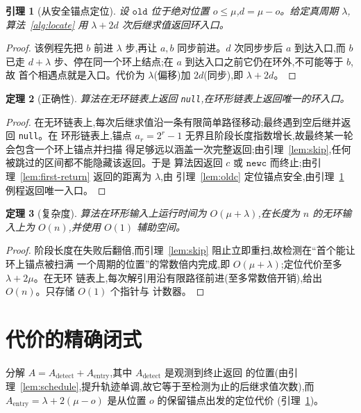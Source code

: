 \documentclass[11pt]{ctexart}
\newtheorem{theorem}{定理}[section]
\newtheorem{lemma}[theorem]{引理}
\newcommand{\nullnode}{\texttt{null}}
\newcommand{\oldc}{\texttt{old}}
\newcommand{\newc}{\texttt{newc}}
\begin{document}
\begin{lemma}[从安全锚点定位]
\label{lem:localization}
设 $\oldc$ 位于绝对位置 $o\le\mu$,$d=\mu-o$。给定真周期 $\lambda$,算法~\ref{alg:locate}
用 $\lambda+2d$ 次后继求值返回环入口。
\end{lemma}
\begin{proof}
该例程先把 $b$ 前进 $\lambda$ 步,再让 $a,b$ 同步前进。$d$ 次同步步后 $a$ 到达入口,而 $b$
已走 $d+\lambda$ 步、停在同一个环上结点;在 $a$ 到达入口之前它仍在环外,不可能等于 $b$,故
首个相遇点就是入口。代价为 $\lambda$(偏移)加 $2d$(同步),即 $\lambda+2d$。
\end{proof}

\begin{theorem}[正确性]
\label{thm:correctness}
算法在无环链表上返回 \nullnode{},在环形链表上返回唯一的环入口。
\end{theorem}

\begin{proof}
在无环链表上,每次后继求值沿一条有限简单路径移动;最终遇到空后继并返回 \nullnode{}。在
环形链表上,锚点 $a_r=2^r-1$ 无界且阶段长度指数增长,故最终某一轮会包含一个环上锚点并扫描
得足够远以涵盖一次完整返回;由引理~\ref{lem:skip},任何被跳过的区间都不能隐藏该返回。于是
算法因返回 $c$ 或 $\newc$ 而终止;由引理~\ref{lem:first-return} 返回的距离为 $\lambda$,由
引理~\ref{lem:oldc} 定位锚点安全,由引理~\ref{lem:localization} 例程返回唯一入口。
\end{proof}

\begin{theorem}[复杂度]
\label{thm:complexity}
算法在环形输入上运行时间为 $O(\mu+\lambda)$,在长度为 $n$ 的无环输入上为 $O(n)$,并使用
$O(1)$ 辅助空间。
\end{theorem}

\begin{proof}
阶段长度在失败后翻倍,而引理~\ref{lem:skip} 阻止立即重扫,故检测在``首个能让环上锚点被扫满
一个周期的位置''的常数倍内完成,即 $O(\mu+\lambda)$;定位代价至多 $\lambda+2\mu$。在无环
链表上,每次解引用沿有限路径前进(至多常数倍开销),给出 $O(n)$。只存储 $O(1)$ 个指针与
计数器。
\end{proof}

\section{代价的精确闭式}
\label{sec:closedform}

分解 $A=A_{\mathrm{detect}}+A_{\mathrm{entry}}$,其中 $A_{\mathrm{detect}}$ 是观测到终止返回
的位置(由引理~\ref{lem:schedule},提升轨迹单调,故它等于至检测为止的后继求值次数),而
$A_{\mathrm{entry}}=\lambda+2(\mu-o)$ 是从位置 $o$ 的保留锚点出发的定位代价
(引理~\ref{lem:localization})。
\end{document}
